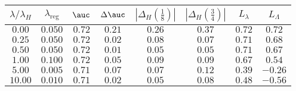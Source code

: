 \begin{tabular}{cccccccc} 
\toprule 
$\lambda / \lambda_H$ & $\lambda_\text{reg}$ & $\auc$ & $\Delta \auc$ 
& $|\Delta_H(\frac{1}{8})|$ & $|\Delta_H(\frac{3}{4})|$ & $L_\lambda$ & $L_\Lambda$ \\ 
\midrule 
$0.00$ & $0.050$ & $0.72$ & $0.21$ & $0.26$ & $0.37$ & $0.72$ & $0.72$ \\ 
$0.25$ & $0.050$ & $0.72$ & $0.02$ & $0.08$ & $0.07$ & $0.71$ & $0.68$ \\ 
$0.50$ & $0.050$ & $0.72$ & $0.01$ & $0.05$ & $0.05$ & $0.71$ & $0.67$ \\ 
$1.00$ & $0.100$ & $0.72$ & $0.05$ & $0.09$ & $0.09$ & $0.67$ & $0.54$ \\ 
$5.00$ & $0.005$ & $0.71$ & $0.07$ & $0.07$ & $0.12$ & $0.39$ & $-0.26$ \\ 
$10.00$ & $0.010$ & $0.71$ & $0.02$ & $0.05$ & $0.08$ & $0.48$ & $-0.56$ \\ 
\bottomrule 
\end{tabular} 
